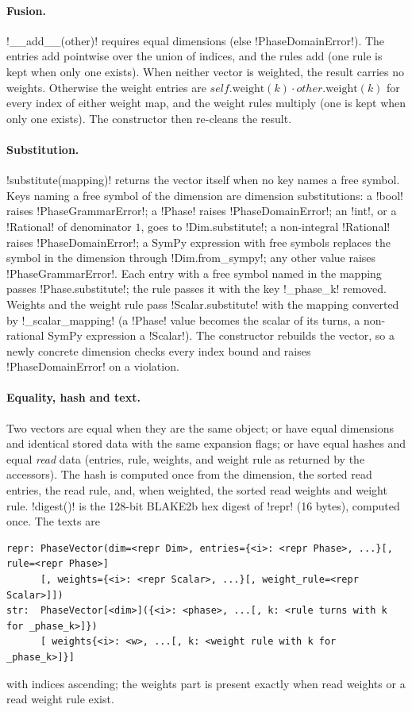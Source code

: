 \paragraph{Fusion.} \py!__add__(other)! requires equal dimensions (else \py!PhaseDomainError!). The entries add pointwise over the union of indices, and the rules add (one rule is kept when only one exists). When neither vector is weighted, the result carries no weights. Otherwise the weight entries are $\mathit{self}.\mathrm{weight}(k)\cdot\mathit{other}.\mathrm{weight}(k)$ for every index of either weight map, and the weight rules multiply (one is kept when only one exists). The constructor then re-cleans the result.

\paragraph{Substitution.} \py!substitute(mapping)! returns the vector itself when no key names a free symbol. Keys naming a free symbol of the dimension are dimension substitutions: a \py!bool! raises \py!PhaseGrammarError!; a \py!Phase! raises \py!PhaseDomainError!; an \py!int!, or a \py!Rational! of denominator $1$, goes to \py!Dim.substitute!; a non-integral \py!Rational! raises \py!PhaseDomainError!; a SymPy expression with free symbols replaces the symbol in the dimension through \py!Dim.from_sympy!; any other value raises \py!PhaseGrammarError!. Each entry with a free symbol named in the mapping passes \py!Phase.substitute!; the rule passes it with the key \code!_phase_k! removed. Weights and the weight rule pass \py!Scalar.substitute! with the mapping converted by \py!_scalar_mapping! (a \py!Phase! value becomes the scalar of its turns, a non-rational SymPy expression a \py!Scalar!). The constructor rebuilds the vector, so a newly concrete dimension checks every index bound and raises \py!PhaseDomainError! on a violation.

\paragraph{Equality, hash and text.} Two vectors are equal when they are the same object; or have equal dimensions and identical stored data with the same expansion flags; or have equal hashes and equal \emph{read} data (entries, rule, weights, and weight rule as returned by the accessors). The hash is computed once from the dimension, the sorted read entries, the read rule, and, when weighted, the sorted read weights and weight rule. \py!digest()! is the 128-bit BLAKE2b hex digest of \py!repr! (16 bytes), computed once. The texts are
\begin{lstlisting}[style=grammar]
repr: PhaseVector(dim=<repr Dim>, entries={<i>: <repr Phase>, ...}[, rule=<repr Phase>]
      [, weights={<i>: <repr Scalar>, ...}[, weight_rule=<repr Scalar>]])
str:  PhaseVector[<dim>]({<i>: <phase>, ...[, k: <rule turns with k for _phase_k>]})
      [ weights{<i>: <w>, ...[, k: <weight rule with k for _phase_k>]}]
\end{lstlisting}
with indices ascending; the weights part is present exactly when read weights or a read weight rule exist.

